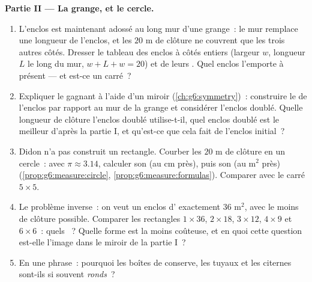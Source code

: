 \begin{problem}
\medskip
\noindent\textbf{Partie II --- La grange, et le cercle.}
\begin{enumerate}[resume]
  \item L'enclos est maintenant adossé au long mur d'une grange~: le
        mur remplace une longueur de l'enclos, et les $20$ m de
        clôture ne couvrent que les trois autres côtés. Dresser le
        tableau des enclos à côtés entiers (largeur $w$, longueur
        $L$ le long du mur, $w + L + w = 20$) et de leurs .
        Quel enclos l'emporte à présent --- et est-ce un carré~?
  \item Expliquer le gagnant à l'aide d'un miroir
        (\cref{ch:g6:symmetry})~: construire le  de
        l'enclos par rapport au mur de la grange et considérer
        l'enclos doublé. Quelle longueur de clôture l'enclos doublé
        utilise-t-il, quel enclos doublé est le meilleur d'après la
        partie I, et qu'est-ce que cela fait de l'enclos initial~?
  \item Didon n'a pas construit un rectangle. Courber les $20$ m de
        clôture en un cercle~: avec $\pi \approx 3.14$, calculer son
         (au cm près), puis son  (au m$^2$ près)
        (\cref{prop:g6:measure:circle},
        \cref{prop:g6:measure:formulas}). Comparer avec le carré
        $5 \times 5$.
  \item Le problème inverse~: on veut un enclos d' exactement
        $36$ m$^2$, avec le moins de clôture possible. Comparer les
        rectangles $1 \times 36$, $2 \times 18$, $3 \times 12$,
        $4 \times 9$ et $6 \times 6$~: quels ~? Quelle
        forme est la moins coûteuse, et en quoi cette question
        est-elle l'image dans le miroir de la partie I~?
  \item En une phrase~: pourquoi les boîtes de conserve, les tuyaux
        et les citernes sont-ils si souvent \emph{ronds}~?
\end{enumerate}


\end{problem}
